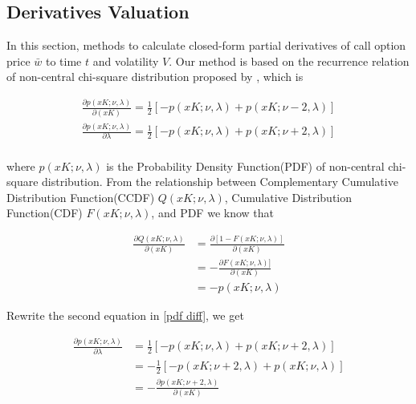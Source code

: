 \subsection{Derivatives Valuation}

In this section, methods to calculate closed-form partial derivatives of call option price $\bar{w}$ to time $t$ and volatility $V$. Our method is based on the recurrence relation of non-central chi-square distribution proposed by \cite{cohen_noncentral_1988}, which is

\begin{equation}\label{pdf diff}
    \begin{gathered}
        \frac{\partial p(xK;\nu,\lambda)}{\partial (xK)}=\frac{1}{2}[-p(xK ; \nu, \lambda)+p(xK ; \nu-2, \lambda)]\\
        \frac{\partial p(xK;\nu,\lambda)}{\partial \lambda}=\frac{1}{2}[-p(xK ; \nu, \lambda)+p(xK ; \nu+2, \lambda)] \\
    \end{gathered}
\end{equation}

\noindent where $p(xK;\nu,\lambda)$ is the Probability Density Function(PDF) of non-central chi-square distribution. From the relationship between Complementary Cumulative Distribution Function(CCDF) $Q(xK;\nu,\lambda)$, Cumulative Distribution Function(CDF) $F(xK;\nu,\lambda)$, and PDF we know that

\begin{equation}\label{CCDF2x}
    \begin{aligned}
        \frac{\partial Q(xK; \nu, \lambda)}{\partial (xK)}&=\frac{\partial[1-F(xK; \nu, \lambda)]}{\partial (xK)} \\ 
        &=-\frac{\partial F(xK; \nu, \lambda)]}{\partial (xK)}\\
        &= -p(xK;\nu,\lambda)
    \end{aligned}
\end{equation}

\noindent Rewrite the second equation in \eqref{pdf diff}, we get

\begin{equation}\label{pdf trans}
    \begin{aligned}
        \frac{\partial p(xK;\nu,\lambda)}{\partial \lambda}&=\frac{1}{2}[-p(xK ; \nu, \lambda)+p(xK ; \nu+2, \lambda)] \\
        &=-\frac{1}{2}[-p(xK ; \nu+2, \lambda)+p(xK ; \nu, \lambda)]\\
        &= -\frac{\partial p(xK;\nu+2,\lambda)}{\partial (xK)}
    \end{aligned}
\end{equation}

